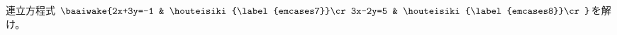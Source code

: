 連立方程式
$\baaiwake{2x+3y=-1 & \houteisiki{\label{emcases7}}\cr
3x-2y=5 & \houteisiki{\label{emcases8}}\cr}$を解け。
